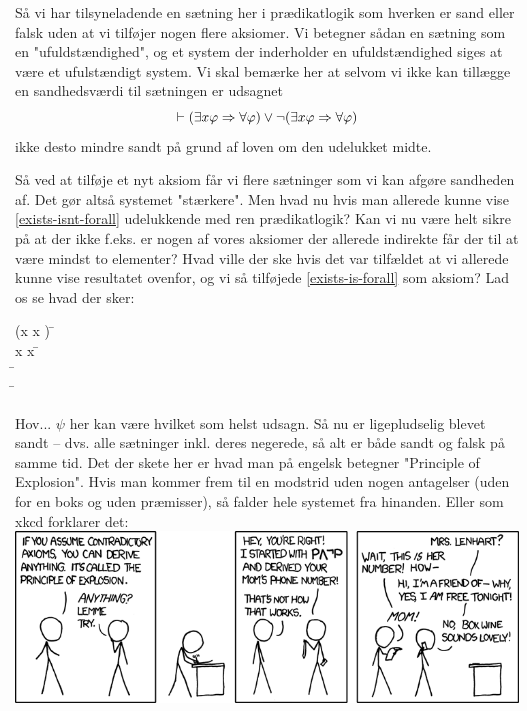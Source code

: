 Så vi har tilsyneladende en sætning her i prædikatlogik som hverken er sand eller falsk uden at vi tilføjer nogen flere aksiomer.
Vi betegner sådan en sætning som en "ufuldstændighed"{},
og et system der inderholder en ufuldstændighed siges at være et ufulstændigt system.
Vi skal bemærke her at selvom vi ikke kan tillægge en sandhedsværdi til sætningen er udsagnet
\[
	\vdash (\exists x \varphi \Rightarrow \forall \varphi) \lor \neg(\exists x \varphi \Rightarrow \forall \varphi)
\]
ikke desto mindre sandt på grund af loven om den udelukket midte.

Så ved at tilføje et nyt aksiom får vi flere sætninger som vi kan afgøre sandheden af. Det gør altså systemet "stærkere".
Men hvad nu hvis man allerede kunne vise \eqref{exists-isnt-forall} udelukkende med ren prædikatlogik?
Kan vi nu være helt sikre på at der ikke f.eks. er nogen af vores aksiomer der allerede indirekte får der til at være mindst
to elementer? Hvad ville der ske hvis det var tilfældet at vi allerede kunne vise resultatet ovenfor, og vi så tilføjede
\eqref{exists-is-forall} som aksiom? Lad os se hvad der sker:
\begin{proofbox}
	\: \neg(\exists x \phi \imp \forall x \phi) \=  \\
	\: \exists x \phi \imp \forall x \phi \=  \\
	\: \bot \=  \\
	\: \psi \= 
\end{proofbox}
Hov... $\psi$ her kan være hvilket som helst udsagn. Så nu er  ligepludselig blevet sandt -- dvs. alle sætninger inkl. deres negerede,
så alt er både sandt og falsk på samme tid. Det der skete her er hvad man på engelsk betegner "Principle of Explosion"{}. Hvis man kommer frem til en
modstrid uden nogen antagelser (uden for en boks og uden præmisser), så falder hele systemet fra hinanden. Eller som xkcd forklarer det:
\\\includegraphics[width=\textwidth]{principle_of_explosion.png}

